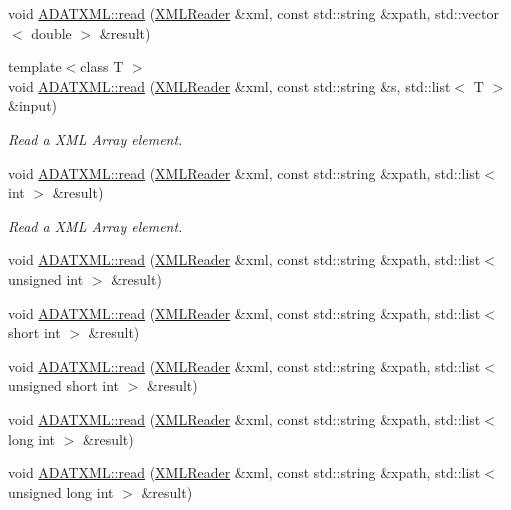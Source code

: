 \begin{DoxyCompactItemize}
\item 
void \mbox{\hyperlink{group__io_ga49fa13abbc0b2a2273c58d328d1e7d70}{A\+D\+A\+T\+X\+M\+L\+::read}} (\mbox{\hyperlink{classADATXML_1_1XMLReader}{X\+M\+L\+Reader}} \&xml, const std\+::string \&xpath, std\+::vector$<$ double $>$ \&result)
\item 
{\footnotesize template$<$class T $>$ }\\void \mbox{\hyperlink{group__io_gacca340ef5b3a2ee3626cb544539f5e64}{A\+D\+A\+T\+X\+M\+L\+::read}} (\mbox{\hyperlink{classADATXML_1_1XMLReader}{X\+M\+L\+Reader}} \&xml, const std\+::string \&s, std\+::list$<$ T $>$ \&input)
\begin{DoxyCompactList}\small\item\em Read a X\+ML Array element. \end{DoxyCompactList}\item 
void \mbox{\hyperlink{group__io_gab7d805fe66e6e3f1f897d4dabd3b29ad}{A\+D\+A\+T\+X\+M\+L\+::read}} (\mbox{\hyperlink{classADATXML_1_1XMLReader}{X\+M\+L\+Reader}} \&xml, const std\+::string \&xpath, std\+::list$<$ int $>$ \&result)
\begin{DoxyCompactList}\small\item\em Read a X\+ML Array element. \end{DoxyCompactList}\item 
void \mbox{\hyperlink{group__io_gab76dffc06569f27474fb03e08b372393}{A\+D\+A\+T\+X\+M\+L\+::read}} (\mbox{\hyperlink{classADATXML_1_1XMLReader}{X\+M\+L\+Reader}} \&xml, const std\+::string \&xpath, std\+::list$<$ unsigned int $>$ \&result)
\item 
void \mbox{\hyperlink{group__io_gaf316ff420b43fcc4c23590001af57c66}{A\+D\+A\+T\+X\+M\+L\+::read}} (\mbox{\hyperlink{classADATXML_1_1XMLReader}{X\+M\+L\+Reader}} \&xml, const std\+::string \&xpath, std\+::list$<$ short int $>$ \&result)
\item 
void \mbox{\hyperlink{group__io_ga6a4f6e0bca990676d09efaf318ed8eb7}{A\+D\+A\+T\+X\+M\+L\+::read}} (\mbox{\hyperlink{classADATXML_1_1XMLReader}{X\+M\+L\+Reader}} \&xml, const std\+::string \&xpath, std\+::list$<$ unsigned short int $>$ \&result)
\item 
void \mbox{\hyperlink{group__io_ga3369838beeb12ff807171fc5978df1be}{A\+D\+A\+T\+X\+M\+L\+::read}} (\mbox{\hyperlink{classADATXML_1_1XMLReader}{X\+M\+L\+Reader}} \&xml, const std\+::string \&xpath, std\+::list$<$ long int $>$ \&result)
\item 
void \mbox{\hyperlink{group__io_gae359122dfdc08b4e41d5d8f230426192}{A\+D\+A\+T\+X\+M\+L\+::read}} (\mbox{\hyperlink{classADATXML_1_1XMLReader}{X\+M\+L\+Reader}} \&xml, const std\+::string \&xpath, std\+::list$<$ unsigned long int $>$ \&result)

\end{DoxyCompactItemize}
